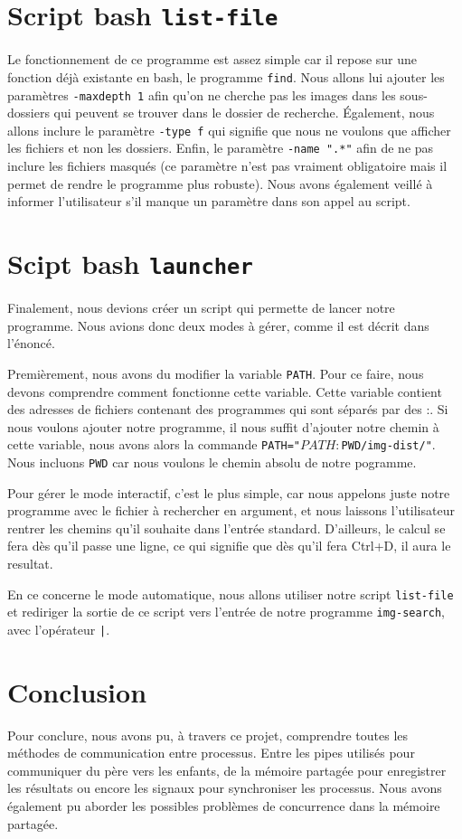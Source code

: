 \documentclass[french]{article}
\begin{document}
\section{Script bash \texttt{list-file}}
Le fonctionnement de ce programme est assez simple car il repose sur une fonction déjà existante en bash, le programme \texttt{find}. Nous allons lui ajouter les paramètres 
\texttt{-maxdepth 1} afin qu'on ne cherche pas les images dans les sous-dossiers qui peuvent se trouver dans le dossier de recherche. Également, nous allons inclure 
le paramètre \texttt{-type f} qui signifie que nous ne voulons que afficher les fichiers et non les dossiers. Enfin, le paramètre \texttt{-name ".*"} afin de ne pas 
inclure les fichiers masqués (ce paramètre n'est pas vraiment obligatoire mais il permet de rendre le programme plus robuste). Nous avons également veillé à 
informer l'utilisateur s'il manque un paramètre dans son appel au script. 

\section{Scipt bash \texttt{launcher}}
Finalement, nous devions créer un script qui permette de lancer notre programme. Nous avions donc deux modes à gérer, comme il est décrit dans l'énoncé. 

Premièrement, nous avons du modifier la variable \texttt{PATH}. Pour ce faire, nous devons comprendre comment fonctionne cette variable. Cette variable contient des 
adresses de fichiers contenant des programmes qui sont séparés par des :. Si nous voulons ajouter notre programme, il nous suffit d'ajouter notre chemin à cette 
variable, nous avons alors la commande \texttt{PATH="$PATH:$PWD/img-dist/"}. Nous incluons \texttt{PWD} car nous voulons le chemin absolu de notre pogramme. 

Pour gérer le mode interactif, c'est le plus simple, car nous appelons juste notre programme avec le fichier à rechercher en argument, et nous laissons l'utilisateur 
rentrer les chemins qu'il souhaite dans l'entrée standard. D'ailleurs, le calcul se fera dès qu'il passe une ligne, ce qui signifie que dès qu'il fera Ctrl+D, 
il aura le resultat. 

En ce concerne le mode automatique, nous allons utiliser notre script \texttt{list-file} et rediriger la sortie de ce script vers l'entrée 
de notre programme \texttt{img-search}, avec l'opérateur \texttt{|}. 

\section{Conclusion}
Pour conclure, nous avons pu, à travers ce projet, comprendre toutes les méthodes de communication entre processus. Entre les pipes utilisés pour communiquer du 
père vers les enfants, de la mémoire partagée pour enregistrer les résultats ou encore les signaux pour synchroniser les processus. Nous avons également pu 
aborder les possibles problèmes de concurrence dans la mémoire partagée.
\end{document}
